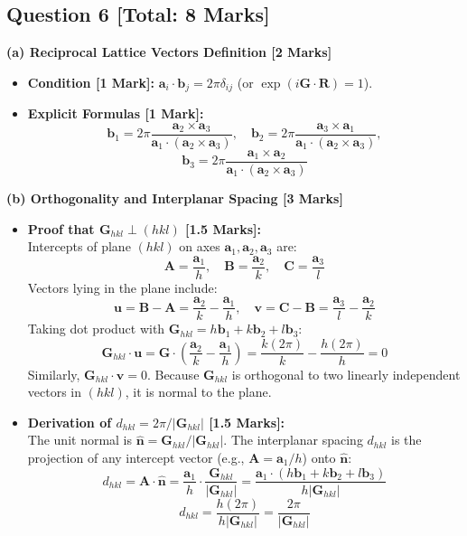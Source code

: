 \documentclass[10pt,a4paper,twocolumn]{article}
\begin{document}
\subsection*{Question 6 [Total: 8 Marks]}
\textbf{(a) Reciprocal Lattice Vectors Definition [2 Marks]}
\begin{itemize}
    \item \textbf{Condition [1 Mark]:} $\bm{a}_i \cdot \bm{b}_j = 2\pi\delta_{ij}$ (or $\exp(i\bm{G}\cdot\bm{R}) = 1$).
    \item \textbf{Explicit Formulas [1 Mark]:}
    $$\bm{b}_1 = 2\pi \frac{\bm{a}_2 \times \bm{a}_3}{\bm{a}_1 \cdot (\bm{a}_2 \times \bm{a}_3)}, \quad \bm{b}_2 = 2\pi \frac{\bm{a}_3 \times \bm{a}_1}{\bm{a}_1 \cdot (\bm{a}_2 \times \bm{a}_3)},$$
    $$\bm{b}_3 = 2\pi \frac{\bm{a}_1 \times \bm{a}_2}{\bm{a}_1 \cdot (\bm{a}_2 \times \bm{a}_3)}$$
\end{itemize}

\textbf{(b) Orthogonality and Interplanar Spacing [3 Marks]}
\begin{itemize}
    \item \textbf{Proof that $\bm{G}_{hkl} \perp (hkl)$ [1.5 Marks]:}\\
    Intercepts of plane $(hkl)$ on axes $\bm{a}_1, \bm{a}_2, \bm{a}_3$ are:
    $$\bm{A} = \frac{\bm{a}_1}{h}, \quad \bm{B} = \frac{\bm{a}_2}{k}, \quad \bm{C} = \frac{\bm{a}_3}{l}$$
    Vectors lying in the plane include:
    $$\bm{u} = \bm{B} - \bm{A} = \frac{\bm{a}_2}{k} - \frac{\bm{a}_1}{h}, \quad \bm{v} = \bm{C} - \bm{B} = \frac{\bm{a}_3}{l} - \frac{\bm{a}_2}{k}$$
    Taking dot product with $\bm{G}_{hkl} = h\bm{b}_1 + k\bm{b}_2 + l\bm{b}_3$:
    $$\bm{G}_{hkl} \cdot \bm{u} = \bm{G} \cdot \left(\frac{\bm{a}_2}{k} - \frac{\bm{a}_1}{h}\right) = \frac{k(2\pi)}{k} - \frac{h(2\pi)}{h} = 0$$
    Similarly, $\bm{G}_{hkl} \cdot \bm{v} = 0$. Because $\bm{G}_{hkl}$ is orthogonal to two linearly independent vectors in $(hkl)$, it is normal to the plane.
    \item \textbf{Derivation of $d_{hkl} = 2\pi/|\bm{G}_{hkl}|$ [1.5 Marks]:}\\
    The unit normal is $\hat{\bm{n}} = \bm{G}_{hkl}/|\bm{G}_{hkl}|$. The interplanar spacing $d_{hkl}$ is the projection of any intercept vector (e.g., $\bm{A} = \bm{a}_1/h$) onto $\hat{\bm{n}}$:
    $$d_{hkl} = \bm{A} \cdot \hat{\bm{n}} = \frac{\bm{a}_1}{h} \cdot \frac{\bm{G}_{hkl}}{|\bm{G}_{hkl}|} = \frac{\bm{a}_1 \cdot (h\bm{b}_1 + k\bm{b}_2 + l\bm{b}_3)}{h|\bm{G}_{hkl}|}$$
    $$d_{hkl} = \frac{h(2\pi)}{h|\bm{G}_{hkl}|} = \frac{2\pi}{|\bm{G}_{hkl}|}$$
\end{itemize}
\end{document}
